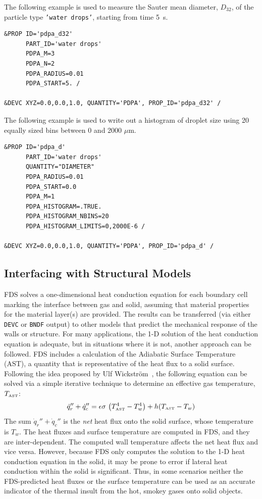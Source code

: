 \documentclass[11pt]{book}
\newcommand{\ct}{\tt\small}
\newcommand{\be}{\begin{equation}}
\newcommand{\ee}{\end{equation}}
\begin{document}
\noindent The following example is used to measure the Sauter mean diameter, $D_{32}$, of the particle type {\ct 'water drops'}, starting from
time 5~s.
\footnotesize
\begin{verbatim}
&PROP ID='pdpa_d32'
      PART_ID='water drops'
      PDPA_M=3
      PDPA_N=2
      PDPA_RADIUS=0.01
      PDPA_START=5. /

&DEVC XYZ=0.0,0.0,1.0, QUANTITY='PDPA', PROP_ID='pdpa_d32' /
\end{verbatim}
\normalsize

\noindent The following example is used to write out a histogram of droplet size using 20 equally sized bins between 0 and 2000 $\mu$m.
\footnotesize
\begin{verbatim}
&PROP ID='pdpa_d'
      PART_ID='water drops'
      QUANTITY="DIAMETER"
      PDPA_RADIUS=0.01
      PDPA_START=0.0
      PDPA_M=1
      PDPA_HISTOGRAM=.TRUE.
      PDPA_HISTOGRAM_NBINS=20
      PDPA_HISTOGRAM_LIMITS=0,2000E-6 /

&DEVC XYZ=0.0,0.0,1.0, QUANTITY='PDPA', PROP_ID='pdpa_d' /
\end{verbatim}

\normalsize



\subsection{Interfacing with Structural Models}
\label{info:AST}

FDS solves a one-dimensional heat conduction equation for each
boundary cell marking the interface between gas and solid, assuming
that material properties for the material layer(s) are provided. The
results can be transferred (via either {\ct DEVC} or {\ct BNDF}
output) to other models that predict the mechanical response of the
walls or structure. For many applications, the 1-D solution of the
heat conduction equation is adequate, but in situations where it is
not, another approach can be followed. FDS includes a calculation of
the Adiabatic Surface Temperature (AST), a quantity that is
representative of the heat flux to a solid surface. Following the idea
proposed by Ulf Wickstr\"{o}m~\cite{Wickstrom:Interflam2007}, the
following equation can be solved via a simple iterative technique to
determine an effective gas temperature, $T_{\hbox{\tiny AST}}$:
\be \dot{q}_r'' + \dot{q}_c'' = \epsilon \sigma \, \left(
T_{\hbox{\tiny AST}}^4 - T_w^4 \right) + h (T_{\hbox{\tiny AST}} - T_w)  \ee
The sum $\dot{q}_r'' + \dot{q}_c''$ is the {\em net} heat flux onto
the solid surface, whose temperature is $T_w$. The heat fluxes and
surface temperature are computed in FDS, and they are
inter-dependent. The computed wall temperature affects the net heat
flux and vice versa. However, because FDS only computes the solution
to the 1-D heat conduction equation in the solid, it may be prone to
error if lateral heat conduction within the solid is
significant. Thus, in some scenarios neither the FDS-predicted heat
fluxes or the surface temperature can be used as an accurate indicator
of the thermal insult from the hot, smokey gases onto solid objects.
\end{document}

